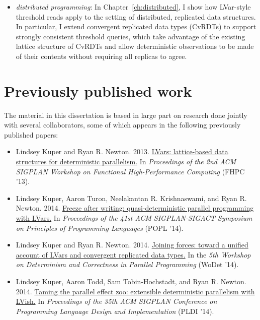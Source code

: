 \begin{itemize}
  \item \emph{distributed programming}: In
    Chapter~\ref{ch:distributed}, I show how LVar-style threshold
    reads apply to the setting of distributed, replicated data
    structures.  In particular, I extend convergent replicated data
    types (CvRDTs) to support strongly consistent threshold queries,
    which take advantage of the existing lattice structure of CvRDTs
    and allow deterministic observations to be made of their contents
    without requiring all replicas to agree.
\end{itemize}
\fi

\section{Previously published work}

\ifdefined\DISSERTATION
The material in this dissertation is based in large part on research
done jointly with several collaborators, some of which appears in the
following previously published papers:


\begin{itemize}
\item Lindsey Kuper and Ryan
  R. Newton. 2013. \href{http://doi.acm.org/10.1145/2502323.2502326}{LVars:
    lattice-based data structures for deterministic parallelism.} In
  \emph{Proceedings of the 2nd ACM SIGPLAN Workshop on Functional
    High-Performance Computing} (FHPC '13).

\item Lindsey Kuper, Aaron Turon, Neelakantan R. Krishnaswami, and
  Ryan
  R. Newton. 2014. \href{http://doi.acm.org/10.1145/2535838.2535842
  }{Freeze after writing: quasi-deterministic parallel programming
    with LVars.} In \emph{Proceedings of the 41st ACM SIGPLAN-SIGACT
    Symposium on Principles of Programming Languages} (POPL '14).

\item Lindsey Kuper and Ryan
  R. Newton. 2014. \href{http://wodet.cs.washington.edu/wp-content/uploads/2014/02/wodet2014-final1.pdf}{Joining
    forces: toward a unified account of LVars and convergent
    replicated data types.} In the \emph{5th Workshop on Determinism
    and Correctness in Parallel Programming} (WoDet '14).

\item Lindsey Kuper, Aaron Todd, Sam Tobin-Hochstadt, and Ryan
  R. Newton. 2014. \href{http://doi.acm.org/10.1145/2594291.2594312
  }{Taming the parallel effect zoo: extensible deterministic
    parallelism with LVish.} In \emph{Proceedings of the 35th ACM
    SIGPLAN Conference on Programming Language Design and
    Implementation} (PLDI '14).
\end{itemize}

